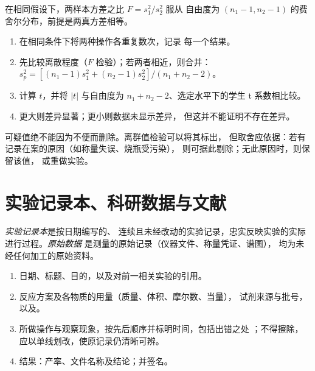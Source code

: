 \begin{proposition}[$F$ 检验]\label{prop:b3:lab-techniques-3:f-test}
在相同假设下，两样本方差之比 $F = s_1^2/s_2^2$ 服从
自由度为 $(n_1 - 1, n_2 - 1)$ 的费舍尔分布，前提是两真方差相等。
\admitted
\end{proposition}

\begin{method}[新方法的产率是否更高？]\label{met:b3:lab-techniques-3:compare-means}
\begin{enumerate}
  \item 在相同条件下将两种操作各重复数次，记录
        每一个结果。
  \item 先比较离散程度（$F$ 检验）；若两者相近，则合并：
        $s_p^2 = [(n_1 - 1)s_1^2 + (n_2 - 1)s_2^2]/(n_1 + n_2 - 2)$。
  \item 计算 $t$，并将 $|t|$ 与自由度为
        $n_1 + n_2 - 2$、选定水平下的学生 t 系数相比较。
  \item 更大则差异显著；更小则数据未显示差异，
        但这并不能证明不存在差异。
\end{enumerate}
\end{method}

可疑值绝不能因为不便而删除。离群值检验可以将其标出，
但取舍应依据：若有记录在案的原因（如称量失误、烧瓶受污染），
则可据此剔除；无此原因时，则保留该值，
或重做实验。

\section{实验记录本、科研数据与文献}

\begin{definition}[实验记录本与原始数据]\label{def:b3:lab-techniques-3:notebook}
\emph{实验记录本}是按日期编写的、
连续且未经改动的实验记录，忠实反映实验的实际进行过程。\emph{原始数据}
是测量的原始记录（仪器文件、称量凭证、谱图），
均为未经任何加工的原始资料。
\end{definition}

\begin{method}[撰写实验记录条目]\label{met:b3:lab-techniques-3:notebook}
\begin{enumerate}
  \item 日期、标题、目的，以及对前一相关实验的引用。
  \item 反应方案及各物质的用量（质量、体积、摩尔数、当量），
        试剂来源与批号，以及。
  \item 所做操作与观察现象，按先后顺序并标明时间，包括出错之处
        ；不得擦除，应以单线划改，使原记录仍清晰可辨。
  \item 结果：产率、文件名称及结论；并签名。
\end{enumerate}
\end{method}

